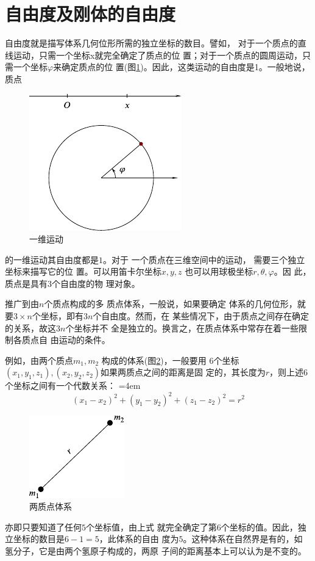 \section{自由度及刚体的自由度}\label{sec:10.01}

自由度就是描写体系几何位形所需的独立坐标的数目。譬如，
对于一个质点的直线运动，只需一个坐标x就完全确定了质点的位
置；对于一个质点的圆周运动，只需一个坐标$ \varphi $来确定质点的位
置(图\ref{fig:10.01})。因此，这类运动的自由度是1。一般地说，质点
\begin{figure}
  \centering
  \includegraphics{figure/fig10.01}
  \caption{一维运动}
  \label{fig:10.01}
\end{figure}
的一维运动其自由度都是$ 1 $。对于
一个质点在三维空间中的运动，
需要三个独立坐标来描写它的位
置。可以用笛卡尔坐标$ x,y,z $
也可以用球极坐标$ r, \theta , \varphi $。因
此，质点是具有$ 3 $个自由度的物
理对象。

推广到由$ n $个质点构成的多
质点体系，一般说，如果要确定
体系的几何位形，就要$ 3 \times n $个坐标，即有$ 3n $个自由度。然而，在
某些情况下，由于质点之间存在确定的关系，故这$ 3n $个坐标并不
全是独立的。换言之，在质点体系中常存在着一些限制各质点自
由运动的条件。

例如，由两个质点$ m _ 1, m _ { 2 } $ 构成的体系(图\ref{fig:10.02})，一般要用
$ 6 $个坐标$ \left( x _ { 1 } , y _ { 1 } , z _ { 1 } \right) ,\left(x_2,y_2,z_2\right) $如果两质点之间的距离是固
定的，其长度为$ r $，则上述$ 6 $个坐标之间有一个代数关系：
\begingroup
\mathindent=4em
\begin{equation}\label{eqn:10.01.01}
  \left( x _ { 1 } - x _ { 2 } \right) ^ { 2 } + \left( y _ { 1 } - y _ { 2 } \right) ^ { 2 } + \left( z _ { 1 } - z _ { 2 } \right) ^ { 2 } = r ^ { 2 }
\end{equation}
\endgroup
\begin{figure}
  \centering
  \includegraphics{figure/fig10.02}
  \caption{两质点体系}
  \label{fig:10.02}
\end{figure}
亦即只要知道了任何$ 5 $个坐标值，由上式
就完全确定了第$ 6 $个坐标的值。因此，独
立坐标的数目是$ 6-1=5 $，此体系的自由
度为$ 5 $。这种体系在自然界是有的，如
氢分子，它是由两个氢原子构成的，两原
子间的距离基本上可以认为是不变的。

